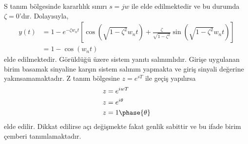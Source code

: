 S tanım bölgesinde kararlılık sınırı $s=jw$ ile elde edilmektedir ve bu durumda $\zeta=0$'dır. Dolayısıyla,
\begin{equation}
\begin{split}
    y(t)&=1-e^{-\zeta w_nt}\left[\cos(\sqrt{1-\zeta^2}w_nt)+\frac{\zeta}{\sqrt{1-\zeta^2}}\sin(\sqrt{1-\zeta^2}w_nt)\right]\\
    &=1-\cos(w_nt)
\end{split}
\end{equation}
elde edilmektedir. Görüldüğü üzere sistem yanıtı salınımlıdır. Girişe uygulanan birim basamak sinyaline karşın sistem salınım yapmakta ve giriş sinyali değerine yakınsamamaktadır. Z tanım bölgesine $z=e^{sT}$ ile geçiş yapılırsa
\begin{equation}
    \begin{split}
        z&=e^{iwT}\\
        z&=e^{i\theta}\\
        z&=1\phase{ \theta}
    \end{split}
\end{equation}
elde edilir. Dikkat edilirse açı değişmekte fakat genlik sabittir ve bu ifade birim çemberi tanımlamaktadır. 
